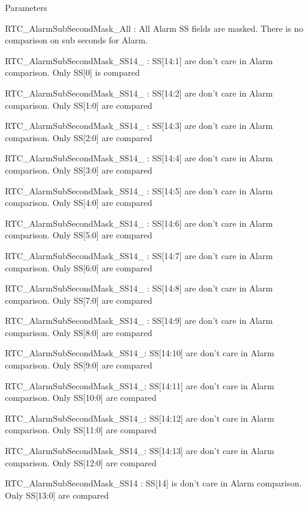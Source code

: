 \begin{DoxyParams}{Parameters}
\begin{DoxyItemize}
\item R\-T\-C\-\_\-\-Alarm\-Sub\-Second\-Mask\-\_\-\-All \-: All Alarm S\-S fields are masked. There is no comparison on sub seconds for Alarm. \item R\-T\-C\-\_\-\-Alarm\-Sub\-Second\-Mask\-\_\-\-S\-S14\-\_ \-: S\-S\mbox{[}14\-:1\mbox{]} are don't care in Alarm comparison. Only S\-S\mbox{[}0\mbox{]} is compared \item R\-T\-C\-\_\-\-Alarm\-Sub\-Second\-Mask\-\_\-\-S\-S14\-\_ \-: S\-S\mbox{[}14\-:2\mbox{]} are don't care in Alarm comparison. Only S\-S\mbox{[}1\-:0\mbox{]} are compared \item R\-T\-C\-\_\-\-Alarm\-Sub\-Second\-Mask\-\_\-\-S\-S14\-\_ \-: S\-S\mbox{[}14\-:3\mbox{]} are don't care in Alarm comparison. Only S\-S\mbox{[}2\-:0\mbox{]} are compared \item R\-T\-C\-\_\-\-Alarm\-Sub\-Second\-Mask\-\_\-\-S\-S14\-\_ \-: S\-S\mbox{[}14\-:4\mbox{]} are don't care in Alarm comparison. Only S\-S\mbox{[}3\-:0\mbox{]} are compared \item R\-T\-C\-\_\-\-Alarm\-Sub\-Second\-Mask\-\_\-\-S\-S14\-\_ \-: S\-S\mbox{[}14\-:5\mbox{]} are don't care in Alarm comparison. Only S\-S\mbox{[}4\-:0\mbox{]} are compared \item R\-T\-C\-\_\-\-Alarm\-Sub\-Second\-Mask\-\_\-\-S\-S14\-\_ \-: S\-S\mbox{[}14\-:6\mbox{]} are don't care in Alarm comparison. Only S\-S\mbox{[}5\-:0\mbox{]} are compared \item R\-T\-C\-\_\-\-Alarm\-Sub\-Second\-Mask\-\_\-\-S\-S14\-\_ \-: S\-S\mbox{[}14\-:7\mbox{]} are don't care in Alarm comparison. Only S\-S\mbox{[}6\-:0\mbox{]} are compared \item R\-T\-C\-\_\-\-Alarm\-Sub\-Second\-Mask\-\_\-\-S\-S14\-\_ \-: S\-S\mbox{[}14\-:8\mbox{]} are don't care in Alarm comparison. Only S\-S\mbox{[}7\-:0\mbox{]} are compared \item R\-T\-C\-\_\-\-Alarm\-Sub\-Second\-Mask\-\_\-\-S\-S14\-\_ \-: S\-S\mbox{[}14\-:9\mbox{]} are don't care in Alarm comparison. Only S\-S\mbox{[}8\-:0\mbox{]} are compared \item R\-T\-C\-\_\-\-Alarm\-Sub\-Second\-Mask\-\_\-\-S\-S14\-\_\-: S\-S\mbox{[}14\-:10\mbox{]} are don't care in Alarm comparison. Only S\-S\mbox{[}9\-:0\mbox{]} are compared \item R\-T\-C\-\_\-\-Alarm\-Sub\-Second\-Mask\-\_\-\-S\-S14\-\_\-: S\-S\mbox{[}14\-:11\mbox{]} are don't care in Alarm comparison. Only S\-S\mbox{[}10\-:0\mbox{]} are compared \item R\-T\-C\-\_\-\-Alarm\-Sub\-Second\-Mask\-\_\-\-S\-S14\-\_\-: S\-S\mbox{[}14\-:12\mbox{]} are don't care in Alarm comparison. Only S\-S\mbox{[}11\-:0\mbox{]} are compared \item R\-T\-C\-\_\-\-Alarm\-Sub\-Second\-Mask\-\_\-\-S\-S14\-\_\-: S\-S\mbox{[}14\-:13\mbox{]} are don't care in Alarm comparison. Only S\-S\mbox{[}12\-:0\mbox{]} are compared \item R\-T\-C\-\_\-\-Alarm\-Sub\-Second\-Mask\-\_\-\-S\-S14 \-: S\-S\mbox{[}14\mbox{]} is don't care in Alarm comparison. Only S\-S\mbox{[}13\-:0\mbox{]} are compared \item 
\end{DoxyItemize}
\end{DoxyParams}
